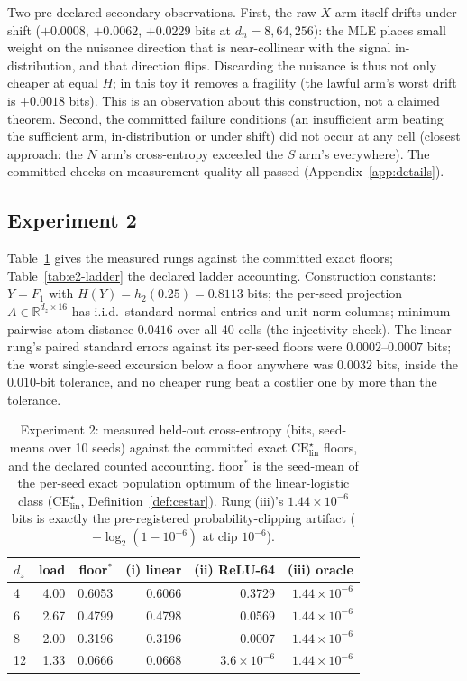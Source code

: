 \documentclass[twocolumn,10pt]{article}
\theoremstyle{definition}
\theoremstyle{remark}
\newcommand{\R}{\mathbb{R}}
\newcommand{\hb}{h_2}
\newcommand{\dz}{d_z}
\newcommand{\dn}{d_n}
\newcommand{\CE}{\mathrm{CE}}
\begin{document}
Two pre-declared secondary observations. First, the raw $X$ arm itself
drifts under shift ($+0.0008$, $+0.0062$, $+0.0229$ bits at
$\dn = 8, 64, 256$): the MLE places small weight on the nuisance
direction that is near-collinear with the signal in-distribution, and
that direction flips. Discarding the nuisance is thus not only cheaper
at equal $H$; in this toy it removes a fragility (the lawful arm's
worst drift is $+0.0018$ bits). This is an observation about this
construction, not a claimed theorem. Second, the committed failure
conditions (an insufficient arm beating the sufficient arm,
in-distribution or under shift) did not occur at any cell (closest
approach: the $N$ arm's cross-entropy exceeded the $S$ arm's
everywhere). The committed checks on measurement quality all passed
(Appendix~\ref{app:details}).

\subsection{Experiment 2}
\label{app:expdetails-e2}

Table~\ref{tab:e2-floors} gives the measured rungs against the
committed exact floors; Table~\ref{tab:e2-ladder} the declared ladder
accounting. Construction constants: $Y = F_1$ with
$H(Y) = \hb(0.25) = 0.8113$ bits; the per-seed projection
$A \in \R^{\dz \times 16}$ has i.i.d.\ standard normal entries and
unit-norm columns; minimum pairwise atom distance $0.0416$ over all 40
cells (the injectivity check). The linear rung's paired standard
errors against its per-seed floors were $0.0002$--$0.0007$ bits; the
worst single-seed excursion below a floor anywhere was $0.0032$ bits,
inside the $0.010$-bit tolerance, and no cheaper rung beat a costlier
one by more than the tolerance.

\begin{table}[H]
\centering
\small
\caption{Experiment 2: measured held-out cross-entropy (bits, seed-means over
10 seeds) against the committed exact $\CE^{\star}_{\mathrm{lin}}$
floors, and the declared
counted accounting. floor$^*$ is the seed-mean of the per-seed exact
population optimum of the linear-logistic class
($\CE^{\star}_{\mathrm{lin}}$, Definition~\ref{def:cestar}).
Rung (iii)'s $1.44 \times 10^{-6}$
bits is exactly the pre-registered probability-clipping artifact
($-\log_2(1 - 10^{-6})$ at clip $10^{-6}$).}
\label{tab:e2-floors}
\begin{tabular}{lrrrrr}
\toprule
$\dz$ & load & floor$^*$ & (i) linear & (ii) ReLU-64 & (iii) oracle \\
\midrule
4 & 4.00 & 0.6053 & 0.6066 & 0.3729 & $1.44 \times 10^{-6}$ \\
6 & 2.67 & 0.4799 & 0.4798 & 0.0569 & $1.44 \times 10^{-6}$ \\
8 & 2.00 & 0.3196 & 0.3196 & 0.0007 & $1.44 \times 10^{-6}$ \\
12 & 1.33 & 0.0666 & 0.0668 & $3.6 \times 10^{-6}$ & $1.44 \times 10^{-6}$ \\
\bottomrule
\end{tabular}
\end{table}
\end{document}
